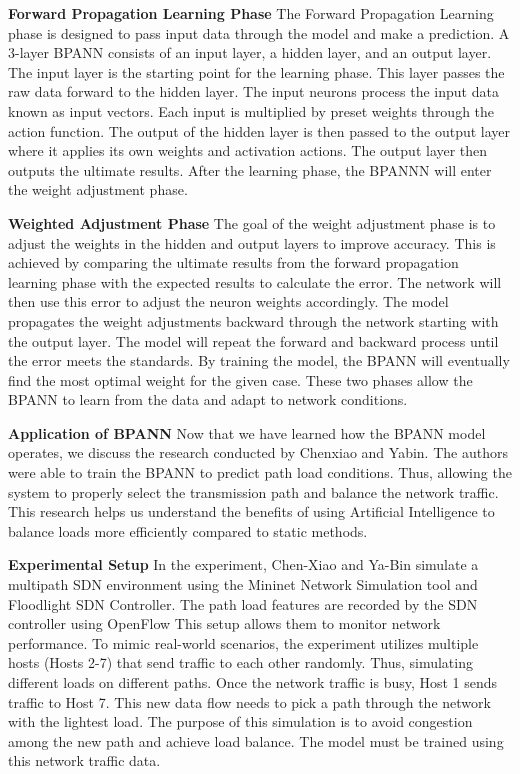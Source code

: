 \documentclass[conference]{IEEEtran}
\begin{document}
\textbf{Forward Propagation Learning Phase}
The Forward Propagation Learning phase is designed to pass input data through the model and make a prediction. A 3-layer BPANN consists of an input layer, a hidden layer, and an output layer. The input layer is the starting point for the learning phase. This layer passes the raw data forward to the hidden layer. The input neurons process the input data known as input vectors. Each input is multiplied by preset weights through the action function\cite{Chen-Xiao_Ya-bin_2016}. The output of the hidden layer is then passed to the output layer where it applies its own weights and activation actions. The output layer then outputs the ultimate results. After the learning phase, the BPANNN will enter the weight adjustment phase.

\textbf{Weighted Adjustment Phase}
The goal of the weight adjustment phase is to adjust the weights in the hidden and output layers to improve accuracy. This is achieved by comparing the ultimate results from the forward propagation learning phase with the expected results to calculate the error. The network will then use this error to adjust the neuron weights accordingly. The model propagates the weight adjustments backward through the network starting with the output layer. The model will repeat the forward and backward process until the error meets the standards. By training the model, the BPANN will eventually find the most optimal weight for the given case. These two phases allow the BPANN to learn from the data and adapt to network conditions.

\textbf{Application of BPANN}
Now that we have learned how the BPANN model operates, we discuss the research conducted by Chenxiao and Yabin. The authors were able to train the BPANN to predict path load conditions. Thus, allowing the system to properly select the transmission path and balance the network traffic. This research helps us understand the benefits of using Artificial Intelligence to balance loads more efficiently compared to static methods. 

\textbf{Experimental Setup}
In the experiment, Chen-Xiao and Ya-Bin simulate a multipath SDN environment using the Mininet Network Simulation tool and Floodlight SDN Controller. The path load features are recorded by the SDN controller using OpenFlow This setup allows them to monitor network performance. To mimic real-world scenarios, the experiment utilizes multiple hosts (Hosts 2-7) that send traffic to each other randomly. Thus, simulating different loads on different paths. Once the network traffic is busy, Host 1 sends traffic to Host 7. This new data flow needs to pick a path through the network with the lightest load. The purpose of this simulation is to avoid congestion among the new path and achieve load balance. The model must be trained using this network traffic data.
\end{document}

